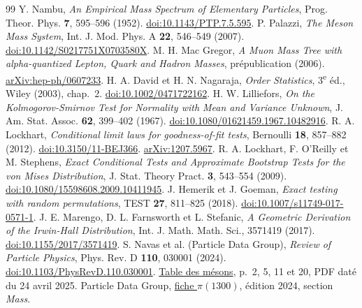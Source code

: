 \documentclass[11pt,a4paper]{article}
\begin{document}
\begin{thebibliography}{99}
 Y. Nambu, \emph{An Empirical Mass Spectrum of Elementary Particles}, Prog. Theor. Phys. \textbf{7}, 595--596 (1952). \href{https://doi.org/10.1143/PTP.7.5.595}{doi:10.1143/PTP.7.5.595}.
 P. Palazzi, \emph{The Meson Mass System}, Int. J. Mod. Phys. A \textbf{22}, 546--549 (2007). \href{https://doi.org/10.1142/S0217751X0703580X}{doi:10.1142/S0217751X0703580X}.
 M. H. Mac Gregor, \emph{A Muon Mass Tree with alpha-quantized Lepton, Quark and Hadron Masses}, prépublication (2006). \href{https://arxiv.org/abs/hep-ph/0607233}{arXiv:hep-ph/0607233}.
 H. A. David et H. N. Nagaraja, \emph{Order Statistics}, 3\textsuperscript{e} éd., Wiley (2003), chap.~2. \href{https://doi.org/10.1002/0471722162}{doi:10.1002/0471722162}.
 H. W. Lilliefors, \emph{On the Kolmogorov-Smirnov Test for Normality with Mean and Variance Unknown}, J. Am. Stat. Assoc. \textbf{62}, 399--402 (1967). \href{https://doi.org/10.1080/01621459.1967.10482916}{doi:10.1080/01621459.1967.10482916}.
 R. A. Lockhart, \emph{Conditional limit laws for goodness-of-fit tests}, Bernoulli \textbf{18}, 857--882 (2012). \href{https://doi.org/10.3150/11-BEJ366}{doi:10.3150/11-BEJ366}. \href{https://arxiv.org/abs/1207.5967}{arXiv:1207.5967}.
 R. A. Lockhart, F. O'Reilly et M. Stephens, \emph{Exact Conditional Tests and Approximate Bootstrap Tests for the von Mises Distribution}, J. Stat. Theory Pract. \textbf{3}, 543--554 (2009). \href{https://doi.org/10.1080/15598608.2009.10411945}{doi:10.1080/15598608.2009.10411945}.
 J. Hemerik et J. Goeman, \emph{Exact testing with random permutations}, TEST \textbf{27}, 811--825 (2018). \href{https://doi.org/10.1007/s11749-017-0571-1}{doi:10.1007/s11749-017-0571-1}.
 J. E. Marengo, D. L. Farnsworth et L. Stefanic, \emph{A Geometric Derivation of the Irwin-Hall Distribution}, Int. J. Math. Math. Sci., 3571419 (2017). \href{https://doi.org/10.1155/2017/3571419}{doi:10.1155/2017/3571419}.
 S. Navas et al. (Particle Data Group), \emph{Review of Particle Physics}, Phys. Rev. D \textbf{110}, 030001 (2024). \href{https://doi.org/10.1103/PhysRevD.110.030001}{doi:10.1103/PhysRevD.110.030001}. \href{https://pdg.lbl.gov/2024/tables/rpp2024-sum-mesons.pdf}{Table des mésons}, p.~2, 5, 11 et 20, PDF daté du 24 avril 2025.
 Particle Data Group, \href{https://pdg.lbl.gov/2024/listings/rpp2024-list-pi-1300.pdf}{fiche $\pi(1300)$}, édition 2024, section \emph{Mass}.
\end{thebibliography}
\end{document}
